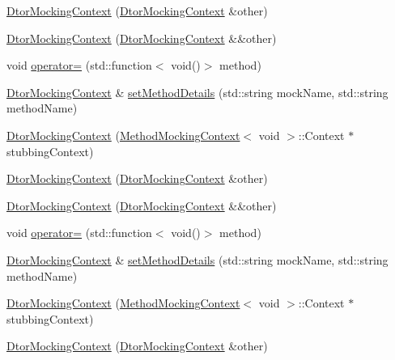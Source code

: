 \begin{DoxyCompactItemize}
\item 
\mbox{\hyperlink{classfakeit_1_1DtorMockingContext_a03939798c9836d082d94fe4e84d3dcd3}{Dtor\+Mocking\+Context}} (\mbox{\hyperlink{classfakeit_1_1DtorMockingContext}{Dtor\+Mocking\+Context}} \&other)
\item 
\mbox{\hyperlink{classfakeit_1_1DtorMockingContext_a0cf507524171b8ab2884f269a8a62a60}{Dtor\+Mocking\+Context}} (\mbox{\hyperlink{classfakeit_1_1DtorMockingContext}{Dtor\+Mocking\+Context}} \&\&other)
\item 
void \mbox{\hyperlink{classfakeit_1_1DtorMockingContext_ac65118e0817e56484fb2238d6c1b3f46}{operator=}} (std\+::function$<$ void()$>$ method)
\item 
\mbox{\hyperlink{classfakeit_1_1DtorMockingContext}{Dtor\+Mocking\+Context}} \& \mbox{\hyperlink{classfakeit_1_1DtorMockingContext_ac2e3a23d87a1f48613dd5bf73f457309}{set\+Method\+Details}} (std\+::string mock\+Name, std\+::string method\+Name)
\item 
\mbox{\hyperlink{classfakeit_1_1DtorMockingContext_a81c785463a44f396c4c3e5e0e1c9e40d}{Dtor\+Mocking\+Context}} (\mbox{\hyperlink{classfakeit_1_1MethodMockingContext}{Method\+Mocking\+Context}}$<$ void $>$\+::Context $\ast$stubbing\+Context)
\item 
\mbox{\hyperlink{classfakeit_1_1DtorMockingContext_a03939798c9836d082d94fe4e84d3dcd3}{Dtor\+Mocking\+Context}} (\mbox{\hyperlink{classfakeit_1_1DtorMockingContext}{Dtor\+Mocking\+Context}} \&other)
\item 
\mbox{\hyperlink{classfakeit_1_1DtorMockingContext_a0cf507524171b8ab2884f269a8a62a60}{Dtor\+Mocking\+Context}} (\mbox{\hyperlink{classfakeit_1_1DtorMockingContext}{Dtor\+Mocking\+Context}} \&\&other)
\item 
void \mbox{\hyperlink{classfakeit_1_1DtorMockingContext_ac65118e0817e56484fb2238d6c1b3f46}{operator=}} (std\+::function$<$ void()$>$ method)
\item 
\mbox{\hyperlink{classfakeit_1_1DtorMockingContext}{Dtor\+Mocking\+Context}} \& \mbox{\hyperlink{classfakeit_1_1DtorMockingContext_ac2e3a23d87a1f48613dd5bf73f457309}{set\+Method\+Details}} (std\+::string mock\+Name, std\+::string method\+Name)
\item 
\mbox{\hyperlink{classfakeit_1_1DtorMockingContext_a81c785463a44f396c4c3e5e0e1c9e40d}{Dtor\+Mocking\+Context}} (\mbox{\hyperlink{classfakeit_1_1MethodMockingContext}{Method\+Mocking\+Context}}$<$ void $>$\+::Context $\ast$stubbing\+Context)
\item 
\mbox{\hyperlink{classfakeit_1_1DtorMockingContext_a03939798c9836d082d94fe4e84d3dcd3}{Dtor\+Mocking\+Context}} (\mbox{\hyperlink{classfakeit_1_1DtorMockingContext}{Dtor\+Mocking\+Context}} \&other)

\end{DoxyCompactItemize}
